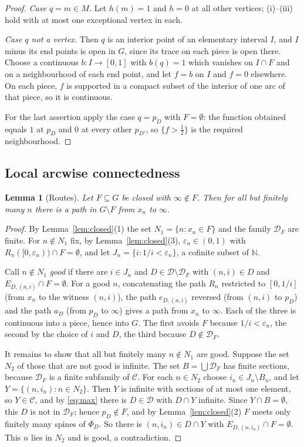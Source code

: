 \documentclass[11pt]{amsart}
\newtheorem{lemma}[theorem]{Lemma}
\theoremstyle{definition}
\theoremstyle{remark}
\newcommand{\N}{\mathbb{N}}
\newcommand{\cD}{\mathcal{D}}
\newcommand{\cC}{\mathcal{C}}
\numberwithin{equation}{section}
\begin{document}
\begin{proof}
\emph{Case $q=m\in M$.} Let $h(m)=1$ and $h=0$ at all other vertices; (i)--(iii) hold with at most one exceptional vertex in each.

\emph{Case $q$ not a vertex.} Then $q$ is an interior point of an elementary interval $I$, and $I$ minus its end points is open in $G$, since its trace on each piece is open there. Choose a continuous $b\colon I\to[0,1]$ with $b(q)=1$ which vanishes on $I\cap F$ and on a neighbourhood of each end point, and let $f=b$ on $I$ and $f=0$ elsewhere. On each piece, $f$ is supported in a compact subset of the interior of one arc of that piece, so it is continuous.

For the last assertion apply the case $q=p_D$ with $F=\emptyset$: the function obtained equals $1$ at $p_D$ and $0$ at every other $p_{D'}$, so $\{f>\frac12\}$ is the required neighbourhood.
\end{proof}

\subsection{Local arcwise connectedness}
\begin{lemma}[Routes]\label{lem:routes}
Let $F\subseteq G$ be closed with $\infty\notin F$. Then for all but finitely many $n$ there is a path in $G\setminus F$ from $x_n$ to $\infty$.
\end{lemma}
\begin{proof}
By Lemma~\ref{lem:closed}(1) the set $N_1=\{n:x_n\in F\}$ and the family $\cD_F$ are finite. For $n\notin N_1$ fix, by Lemma~\ref{lem:closed}(3), $\varepsilon_n\in(0,1)$ with $R_n([0,\varepsilon_n))\cap F=\emptyset$, and let $J_n=\{i:1/i<\varepsilon_n\}$, a cofinite subset of $\N$.

Call $n\notin N_1$ \emph{good} if there are $i\in J_n$ and $D\in\cD\setminus\cD_F$ with $(n,i)\in D$ and $E_{D,(n,i)}\cap F=\emptyset$. For a good $n$, concatenating the path $R_n$ restricted to $[0,1/i]$ (from $x_n$ to the witness $(n,i)$), the path $e_{D,(n,i)}$ reversed (from $(n,i)$ to $p_D$) and the path $a_D$ (from $p_D$ to $\infty$) gives a path from $x_n$ to $\infty$. Each of the three is continuous into a piece, hence into $G$. The first avoids $F$ because $1/i<\varepsilon_n$, the second by the choice of $i$ and $D$, the third because $D\notin\cD_F$.

It remains to show that all but finitely many $n\notin N_1$ are good. Suppose the set $N_2$ of those that are not good is infinite. The set $B=\bigcup\cD_F$ has finite sections, because $\cD_F$ is a finite subfamily of $\cC$. For each $n\in N_2$ choose $i_n\in J_n\setminus B_n$, and let $Y=\{(n,i_n):n\in N_2\}$. Then $Y$ is infinite with sections of at most one element, so $Y\in\cC$, and by \eqref{eq:max} there is $D\in\cD$ with $D\cap Y$ infinite. Since $Y\cap B=\emptyset$, this $D$ is not in $\cD_F$; hence $p_D\notin F$, and by Lemma~\ref{lem:closed}(2) $F$ meets only finitely many spines of $\Phi_D$. So there is $(n,i_n)\in D\cap Y$ with $E_{D,(n,i_n)}\cap F=\emptyset$. This $n$ lies in $N_2$ and is good, a contradiction.
\end{proof}
\end{document}
